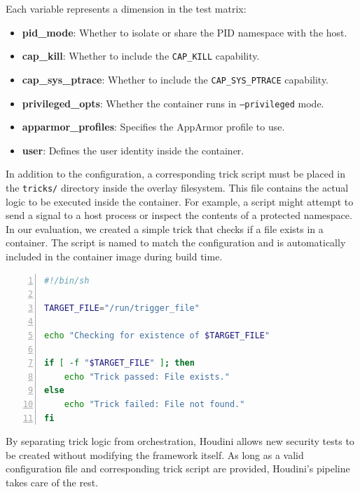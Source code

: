 \begin{doublespace}
Each variable represents a dimension in the test matrix:
\begin{itemize}
\item \textbf{pid\_mode}: Whether to isolate or share the PID namespace with the host.
\item \textbf{cap\_kill}: Whether to include the \texttt{CAP\_KILL} capability.
\item \textbf{cap\_sys\_ptrace}: Whether to include the \texttt{CAP\_SYS\_PTRACE} capability.
\item \textbf{privileged\_opts}: Whether the container runs in \texttt{--privileged} mode.
\item \textbf{apparmor\_profiles}: Specifies the AppArmor profile to use.
\item \textbf{user}: Defines the user identity inside the container.
\end{itemize}


In addition to the configuration, a corresponding trick script must be placed in the \texttt{tricks/} directory inside the overlay filesystem. This file contains the actual logic to be executed inside the container. For example, a script might attempt to send a signal to a host process or inspect the contents of a protected namespace. In our evaluation, we created a simple trick that checks if a file exists in a container. The script is named to match the configuration and is automatically included in the container image during build time.

\begin{lstlisting}[language=bash, caption={Trick Configuration Parameters}, label={lst:escape-trick}, numbers=left, numberstyle=\tiny, stepnumber=1, frame=single, breaklines=true, backgroundcolor=\color{gray!10}, basicstyle=\ttfamily\footnotesize, showspaces=false, showstringspaces=false]
#!/bin/sh

TARGET_FILE="/run/trigger_file"

echo "Checking for existence of $TARGET_FILE"

if [ -f "$TARGET_FILE" ]; then
    echo "Trick passed: File exists."
else
    echo "Trick failed: File not found."
fi

\end{lstlisting}

By separating trick logic from orchestration, Houdini allows new security tests to be created without modifying the framework itself. As long as a valid configuration file and corresponding trick script are provided, Houdini’s pipeline takes care of the rest.


\end{doublespace}
